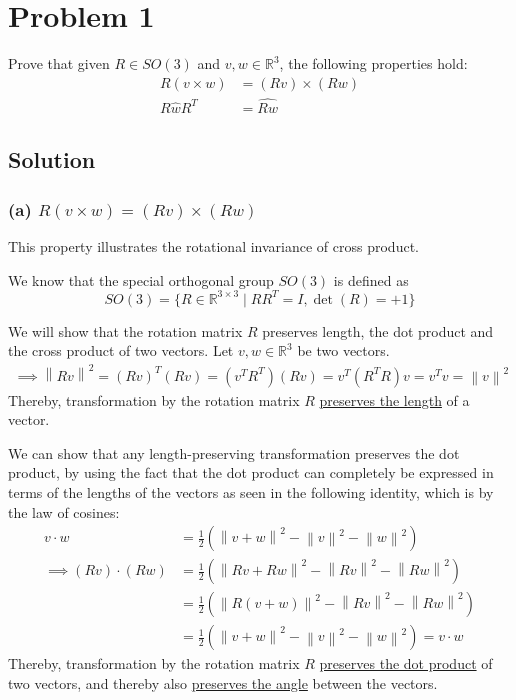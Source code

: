 \section*{Problem 1}

Prove that given \(R \in S O(3)\) and \(v, w \in \mathbb{R}^{3}\), the following properties hold:
\begin{align*}
    R(v \times w)   & =(R v) \times(R w) \\
    R \hat{w} R^{T} & =\widehat{R w}
\end{align*}

\subsection*{Solution}

\subsubsection*{(a) \( R(v \times w) =(R v) \times(R w) \)}

This property illustrates the rotational invariance of cross product.

We know that the special orthogonal group \( SO(3) \) is defined as
\[
    SO(3) = \{ R \in \mathbb{R}^{3 \times 3} \mid R R^{T} = I, \det(R) = +1 \}
\]

We will show that the rotation matrix \( R \) preserves length, the dot product and the cross product of two vectors.
Let \( v, w \in \mathbb{R}^{3} \) be two vectors.
\begin{align*}
    \implies
    \left \| R v \right \| ^{2}
        = {(R v)}^{T} (R v)
    = (v^{T} R^{T}) (R v)
    = v^{T} (R^{T} R) v
    = v^{T} v
    = \left \| v \right \| ^{2}
\end{align*}
Thereby, transformation by the rotation matrix \( R \) \underline{preserves the length} of a vector.

We can show that any length-preserving transformation preserves the dot product, by using the fact that the dot product can completely be expressed in terms of the lengths of the vectors as seen in the following identity, which is by the law of cosines:
\begin{align*}
    v \cdot w
     & = \frac{1}{2} \left( \left \| v + w \right \| ^{2} - \left \| v \right \| ^{2} - \left \| w \right \| ^{2} \right)
    \\ \implies
    (R v) \cdot (R w)
     & = \frac{1}{2} \left( \left \| R v + R w \right \| ^{2} - \left \| R v \right \| ^{2} - \left \| R w \right \| ^{2} \right)
    \\ & = \frac{1}{2} \left( \left \| R (v + w) \right \| ^{2} - \left \| R v \right \| ^{2} - \left \| R w \right \| ^{2} \right)
    \\ & = \frac{1}{2} \left( \left \| v + w \right \| ^{2} - \left \| v \right \| ^{2} - \left \| w \right \| ^{2} \right)
    = v \cdot w
\end{align*}
Thereby, transformation by the rotation matrix \( R \) \underline{preserves the dot product} of two vectors, and thereby also \underline{preserves the angle} between the vectors.


